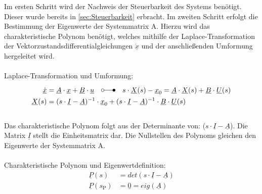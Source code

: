 \documentclass[
	pagesize,
	fontsize=12pt,
	paper=a4,
	oneside,
   reqno
]{scrartcl}
\begin{document}
Im ersten Schritt wird der Nachweis der Steuerbarkeit des Systems benötigt. Dieser wurde bereits in \autoref{sec:Steuerbarkeit} erbracht.
Im zweiten Schritt erfolgt die Bestimmung der Eigenwerte der Systemmatrix A. Hierzu wird das charakteristische Polynom benötigt, welches mithilfe der Laplace-Transformation der Vektorzustandsdifferentialgleichungen $\underline{\dot{x}}$ und der anschließenden Umformung hergeleitet wird.\\\\
Laplace-Transformation und Umformung:
\begin{align*}
    \underline{\dot{x}} &= \underline{A}\cdot\underline{x}+\underline{B}\cdot\underline{u}\quad\laplace \quad s\cdot \underline{X}(s)-\underline{x}_{\mathrm{0}}=\underline{A}\cdot \underline{X}(s)+\underline{B}\cdot \underline{U}(s) \\
    \underline{X}(s) &= (s\cdot \underline{I} - \underline{A})^{-1}\cdot\underline{x}_{\mathrm{0}}+(s\cdot \underline{I} - \underline{A})^{-1}\cdot\underline{B}\cdot\underline{U}(s)
\end{align*}\\
Das charakteristische Polynom folgt aus der Determinante von: ($s\cdot\underline{I}-\underline{A}$). Die Matrix $\underline{I}$ stellt die Einheitsmatrix dar. Die Nullstellen des Polynoms gleichen den Eigenwerte der Systemmatrix A.\\\\
Charakteristische Polynom und Eigenwertdefinition:
\begin{align*}
    \underline{P}(s) &= det(s\cdot\underline{I}-\underline{A}) \\
    \underline{P}(s_{\mathrm{P}}) &= \underline{0} = eig(\underline{A})
\end{align*}
\end{document}
